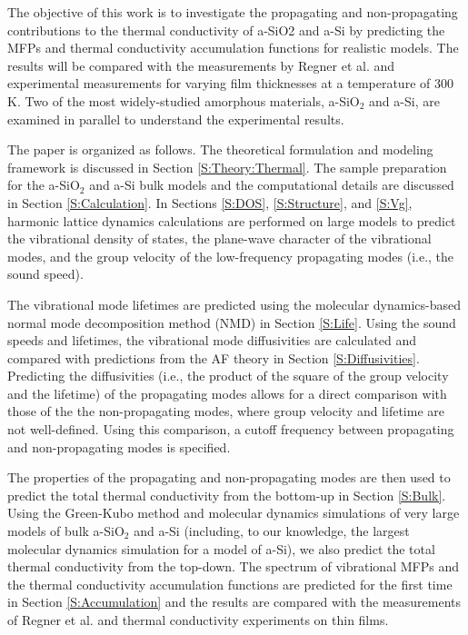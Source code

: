 \documentclass[aps,prb,onecolumn,preprint,superscriptaddress,footinbib,amsmath,amssymb,floatfix]{revtex4}
\begin{document}
The objective of this work is to investigate the propagating 
and non-propagating contributions to the thermal conductivity 
of a-SiO2 and a-Si   
by predicting the MFPs and thermal conductivity 
accumulation functions for realistic models. The results will be  
compared with the measurements by Regner et al.
\cite{regner_broadband_2013} and experimental measurements 
for varying film thicknesses at a temperature of 300 K.
\cite{freeman_thermal_1986,graebner_phonon_1986,
cahill_lattice_1988,cahill_thermal_1989,
love_estimate_1990,cahill_thermal_1994,lee_heat_1997,
yamane_measurement_2002,baldi_thermal_2008,
liu_high_2009,yang_anomalously_2010} Two of the most widely-studied 
amorphous materials, a-SiO$_2$ and a-Si, are examined in parallel 
to understand the experimental results. 

The paper is organized as follows. 
The theoretical formulation and modeling framework is 
discussed in Section \ref{S:Theory:Thermal}. The sample preparation 
for the a-SiO$_2$ and a-Si bulk models and the computational details 
are discussed in Section \ref{S:Calculation}. 
In Sections \ref{S:DOS}, \ref{S:Structure}, and \ref{S:Vg}, 
harmonic lattice dynamics calculations 
are performed on large models to predict the vibrational density of 
states, the plane-wave character of the vibrational modes, and  
the group velocity of the low-frequency propagating modes (i.e., 
the sound speed).  

The vibrational mode lifetimes are predicted using the
molecular dynamics-based normal 
mode decomposition method (NMD) in Section \ref{S:Life}. 
Using the sound speeds and lifetimes, the vibrational 
mode diffusivities are calculated and compared with 
predictions from the AF theory in 
Section \ref{S:Diffusivities}. Predicting the diffusivities 
(i.e., the product of the square of the group velocity and 
the lifetime) of the propagating modes allows for a direct 
comparison with those of the the non-propagating modes, where 
group velocity and lifetime are not well-defined.
\cite{allen_thermal_1993} Using this comparison, a cutoff 
frequency between 
propagating and non-propagating modes is specified.

The properties of the propagating and non-propagating 
modes are then used to predict the total thermal 
conductivity from the bottom-up in Section \ref{S:Bulk}. 
Using the Green-Kubo method and 
molecular dynamics simulations of very large models of 
bulk a-SiO$_2$ and a-Si (including, to our 
knowledge, the largest molecular dynamics simulation for a 
model of a-Si\cite{barkema_high-quality_2000,he_heat_2011}), 
we also predict the total thermal conductivity from the top-down. 
The spectrum of vibrational 
MFPs and the thermal conductivity accumulation functions 
are predicted for the first time in Section \ref{S:Accumulation} 
and the results are compared with the measurements of  
Regner et al.\cite{regner_broadband_2013} and thermal conductivity 
experiments on thin films.\cite{freeman_thermal_1986,
graebner_phonon_1986,cahill_lattice_1988,cahill_thermal_1989,
love_estimate_1990,cahill_thermal_1994,lee_heat_1997,
yamane_measurement_2002,baldi_thermal_2008,
liu_high_2009,yang_anomalously_2010} 
\end{document}
